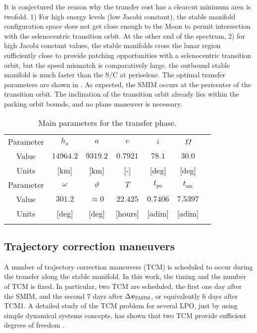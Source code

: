 It is conjectured the reason why the transfer cost has a clearcut minimum area is twofold. 1) For high energy levels (\ie low Jacobi constant), the stable manifold configuration space does not get close enough to the Moon to permit intersection with the selenocentric transition orbit. At the other end of the spectrum, 2) for high Jacobi constant values, the stable manifolds cross the lunar region sufficiently close to provide patching opportunities with a selenocentric transition orbit, but the speed mismatch is comparatively large. \Ie the outbound stable manifold is much faster than the S/C at periselene. The optimal transfer parameters are shown in . As expected, the {SMIM} occurs at the pericenter of the transition orbit. The inclination of the transition orbit already lies within the parking orbit bounds, and no plane maneuver is necessary.
%
\begin{table}[b!]
	\caption{Main parameters for the transfer phase.}
	\label{tab:TranferParameters}
	\centering
	\footnotesize
	\begin{tabular}{ccccccc}
		\TOPlines
		Parameter & $h_a$ & $a$ & $e$ & $i$ & $\Omega$ \\
		Value & $14964.2$ & $9319.2$ & $0.7921$ & $78.1$ & $30.0$ \\ 
		Units & [km] & [km] & [-] & [deg] & [deg] \\
		\MIDline
		Parameter & $\omega$ & $\vartheta$ & $T$ & $t_{\textrm{po}}$ & $t_{\textrm{sm}}$ & \\
		Value & $301.2$ & $\approx0$ & $22.425$ & $0.7406$ & $7.5397$ & \\
		Units & [deg] & [deg] & [hours] & [adim] & [adim] & \\
		\BOTTOMlines
	\end{tabular}
\end{table}
%

\subsection{Trajectory correction maneuvers}\label{subsec:Monte Carlo analysis for TCMs scheduling}
A number of trajectory correction maneuvers (TCM) is scheduled to occur during the transfer along the stable manifold. In this work, the timing and the number of {TCM} is fixed. In particular, two {TCM} are scheduled, the first one day after the {SMIM}, and the second $7$ days after $\Delta\boldsymbol{v}_{\textrm{SMIM}}$, or equivalently $6$ days after TCM1. A detailed study of the TCM problem for several {LPO}, just by using simple dynamical systems concepts, has shown that two {TCM} provide sufficient degrees of freedom \cite{gomez2005TCM}.

